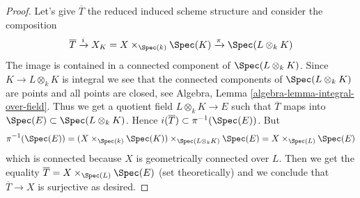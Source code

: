 \begin{proof}
\medskip\noindent
Let's give $\overline{T}$ the reduced induced scheme structure
and consider the composition
$$
\overline{T} \xrightarrow{i} X_K = X \times_{\Spec(k)} \Spec(K)
\xrightarrow{\pi}
\Spec(L \otimes_k K)
$$
The image is contained in a connected component of $\Spec(L \otimes_k K)$.
Since $K \to L \otimes_k K$ is integral we see that
the connected components of $\Spec(L \otimes_k K)$
are points and all points are closed, see
Algebra, Lemma \ref{algebra-lemma-integral-over-field}.
Thus we get a quotient field $L \otimes_k K \to E$
such that $\overline{T}$ maps into $\Spec(E) \subset \Spec(L \otimes_k K)$.
Hence $i(\overline{T}) \subset \pi^{-1}(\Spec(E))$. But
$$
\pi^{-1}(\Spec(E)) =
(X \times_{\Spec(k)} \Spec(K)) \times_{\Spec(L \otimes_k K)} \Spec(E) =
X \times_{\Spec(L)} \Spec(E)
$$
which is connected because $X$ is geometrically connected over $L$.
Then we get the equality
$\overline{T} = X \times_{\Spec(L)} \Spec(E)$ (set theoretically)
and we conclude that $\overline{T} \to X$ is surjective as desired.
\end{proof}